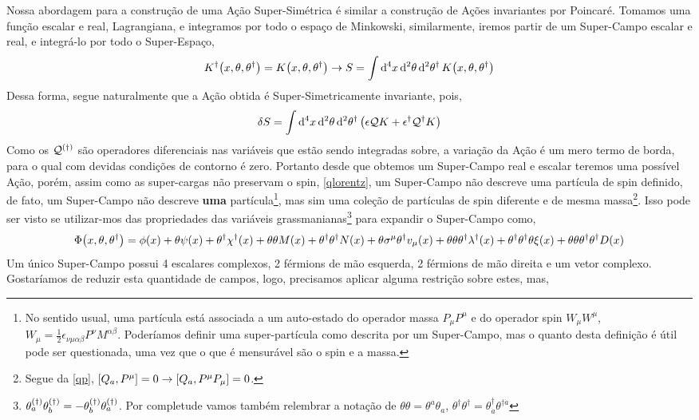 Nossa abordagem para a construção de uma Ação Super-Simétrica é similar a construção de Ações invariantes por Poincaré. Tomamos uma função escalar e real, Lagrangiana, 
e integramos por todo o espaço de Minkowski, similarmente, iremos partir de um Super-Campo escalar e real, e integrá-lo por todo o Super-Espaço,\[K^\dagger\qty(x,\theta,\theta^\dagger)=K\qty(x,\theta,\theta^\dagger)\rightarrow S=\int\dd[4]{x}\dd[2]{\theta}\dd[2]{\theta^\dagger}K\qty(x,\theta,\theta^\dagger)\] Dessa 
forma, segue naturalmente que a Ação obtida é Super-Simetricamente invariante, pois, \[\delta S=\int\dd[4]{x}\dd[2]{\theta}\dd[2]{\theta^\dagger}\qty(\epsilon\mathcal QK+\epsilon^\dagger\mathcal Q^\dagger K)\] Como 
os $\mathcal Q^{\qty(\dagger)}$ são operadores diferenciais nas variáveis que estão sendo integradas sobre, a variação da Ação é um mero termo de borda, para o qual 
com devidas condições de contorno é zero. Portanto desde que obtemos um Super-Campo real e escalar teremos uma possível Ação, porém, 
assim como as super-cargas não preservam o spin, \cref{qlorentz}, um Super-Campo não descreve uma partícula de spin definido, de fato, um 
Super-Campo não descreve \textbf{uma} partícula\footnote{No sentido usual, uma partícula está associada a um auto-estado do operador massa $P_\mu P^\mu$ e do operador spin $W_\mu W^\mu$, $W_\mu=\frac12\epsilon_{\nu\mu\alpha\beta}P^\nu M^{\alpha\beta}$. Poderíamos definir uma super-partícula como descrita por um Super-Campo, mas o 
quanto desta definição é útil pode ser questionada, uma vez que o que é mensurável são o spin e a massa.}, mas sim uma coleção de partículas de spin diferente e de mesma massa\footnote{Segue da \cref{qp}, $\comm{Q_a}{P^\mu}=0\rightarrow \comm{Q_a}{P^\mu P_\mu}=0$.}. Isso 
pode ser visto se utilizar-mos das propriedades das variáveis grassmanianas\footnote{$\theta_a^{\qty(\dagger)}\theta_b^{\qty(\dagger)}=-\theta_b^{\qty(\dagger)}\theta_a^{\qty(\dagger)}$. Por completude vamos também relembrar a notação de $\theta\theta=\theta^a\theta_a$, $\theta^\dagger\theta^\dagger=\theta^\dagger_{\dot a}\theta^{\dagger\dot a}$} para expandir o Super-Campo 
como,\[\Phi\qty(x,\theta,\theta^\dagger)=\phi\qty(x)+\theta\psi\qty(x)+\theta^\dagger\chi^\dagger\qty(x)+\theta\theta M\qty(x)+\theta^\dagger\theta^\dagger N\qty(x)+\theta\sigma^\mu\theta^\dagger v_\mu\qty(x)+\theta\theta\theta^\dagger\lambda^\dagger\qty(x)+\theta^\dagger\theta^\dagger\theta\xi\qty(x)+\theta\theta\theta^\dagger\theta^\dagger D\qty(x)\] Um único 
Super-Campo possui 4 escalares complexos, 2 férmions de mão esquerda, 2 férmions de mão direita e um vetor complexo. Gostaríamos de reduzir esta quantidade de campos, logo, precisamos aplicar alguma restrição sobre estes, mas, 
